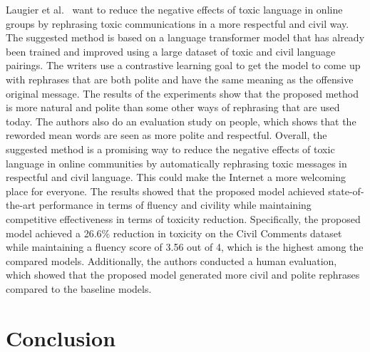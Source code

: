 \documentclass[akbc,twoside,11pt]{article}
\begin{document}
Laugier et al.~\cite{laugier2021civil} want to reduce the negative effects of toxic language in online groups by rephrasing toxic communications in a more respectful and civil way. The suggested method is based on a language transformer model that has already been trained and improved using a large dataset of toxic and civil language pairings. The writers use a contrastive learning goal to get the model to come up with rephrases that are both polite and have the same meaning as the offensive original message. The results of the experiments show that the proposed method is more natural and polite than some other ways of rephrasing that are used today. The authors also do an evaluation study on people, which shows that the reworded mean words are seen as more polite and respectful. Overall, the suggested method is a promising way to reduce the negative effects of toxic language in online communities by automatically rephrasing toxic messages in respectful and civil language. This could make the Internet a more welcoming place for everyone. The results showed that the proposed model achieved state-of-the-art performance in terms of fluency and civility while maintaining competitive effectiveness in terms of toxicity reduction. Specifically, the proposed model achieved a 26.6\% reduction in toxicity on the Civil Comments dataset while maintaining a fluency score of 3.56 out of 4, which is the highest among the compared models. Additionally, the authors conducted a human evaluation, which showed that the proposed model generated more civil and polite rephrases compared to the baseline models.

\section{Conclusion}
\end{document}
